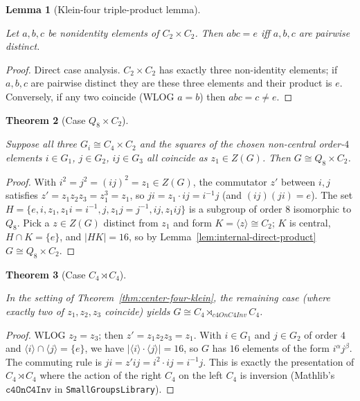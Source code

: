 \documentclass{article}
\newtheorem{theorem}{Theorem}[section]
\newtheorem{lemma}[theorem]{Lemma}
\theoremstyle{definition}
\newcommand{\lean}[1]{}
\newcommand{\leanok}{}
\newcommand{\leanfile}[1]{}
\newcommand{\uses}[1]{}
\begin{document}
\begin{lemma}[Klein-four triple-product lemma]
    \label{lem:abc-eq-e-in-klein}
    \lean{OrderSixteen.Prelim.abc_eq_e_in_klein}
    \leanfile{M2rGroup7/SixteenCase.lean}
    \leanok
    Let $a, b, c$ be nonidentity elements of $C_2 \times C_2$. Then
    $abc = e$ iff $a, b, c$ are pairwise distinct.
\end{lemma}
\begin{proof}
    Direct case analysis. $C_2 \times C_2$ has exactly three non-identity
    elements; if $a, b, c$ are pairwise distinct they are these three
    elements and their product is $e$. Conversely, if any two coincide
    (WLOG $a = b$) then $abc = c \ne e$.
\end{proof}

\begin{theorem}[Case $Q_8 \times C_2$]
    \label{thm:case-Q8-times-C2}
    \uses{lem:internal-direct-product,lem:abc-eq-e-in-klein,
          lem:commutator-in-center-when-quotient-abelian}
    Suppose all three $G_i \cong C_4 \times C_2$ and the squares of the
    chosen non-central order-$4$ elements $i \in G_1$, $j \in G_2$,
    $ij \in G_3$ all coincide as $z_1 \in Z(G)$. Then $G \cong Q_8 \times
    C_2$.
\end{theorem}
\begin{proof}
    \uses{lem:internal-direct-product,lem:abc-eq-e-in-klein,
          lem:commutator-in-center-when-quotient-abelian}
    With $i^2 = j^2 = (ij)^2 = z_1 \in Z(G)$, the commutator $z'$ between
    $i, j$ satisfies $z' = z_1 z_2 z_3 = z_1^3 = z_1$, so
    $ji = z_1 \cdot ij = i^{-1} j$ (and $(ij)(ji) = e$). The set
    $H = \{e, i, z_1, z_1 i = i^{-1}, j, z_1 j = j^{-1}, ij, z_1 ij\}$ is
    a subgroup of order $8$ isomorphic to $Q_8$. Pick a $z \in Z(G)$ distinct
    from $z_1$ and form $K = \langle z \rangle \cong C_2$; $K$ is central,
    $H \cap K = \{e\}$, and $|HK| = 16$, so by
    Lemma~\ref{lem:internal-direct-product} $G \cong Q_8 \times C_2$.
\end{proof}

\begin{theorem}[Case $C_4 \rtimes C_4$]
    \label{thm:case-C4-semidirect-C4}
    \uses{lem:subgroup-product-card,lem:abc-eq-e-in-klein,
          lem:commutator-in-center-when-quotient-abelian}
    In the setting of Theorem~\ref{thm:center-four-klein}, the remaining case
    (where exactly two of $z_1, z_2, z_3$ coincide) yields
    $G \cong C_4 \rtimes_{c4OnC4Inv} C_4$.
\end{theorem}
\begin{proof}
    \uses{lem:subgroup-product-card,lem:abc-eq-e-in-klein,
          lem:commutator-in-center-when-quotient-abelian}
    WLOG $z_2 = z_3$; then $z' = z_1 z_2 z_3 = z_1$. With $i \in G_1$ and
    $j \in G_2$ of order $4$ and $\langle i \rangle \cap \langle j \rangle =
    \{e\}$, we have $|\langle i \rangle \cdot \langle j \rangle| = 16$, so
    $G$ has $16$ elements of the form $i^\alpha j^\beta$. The commuting rule
    is $ji = z' ij = i^2 \cdot ij = i^{-1} j$. This is exactly the
    presentation of $C_4 \rtimes C_4$ where the action of the right $C_4$
    on the left $C_4$ is inversion (Mathlib's $\texttt{c4OnC4Inv}$ in
    \texttt{SmallGroupsLibrary}).
\end{proof}
\end{document}
